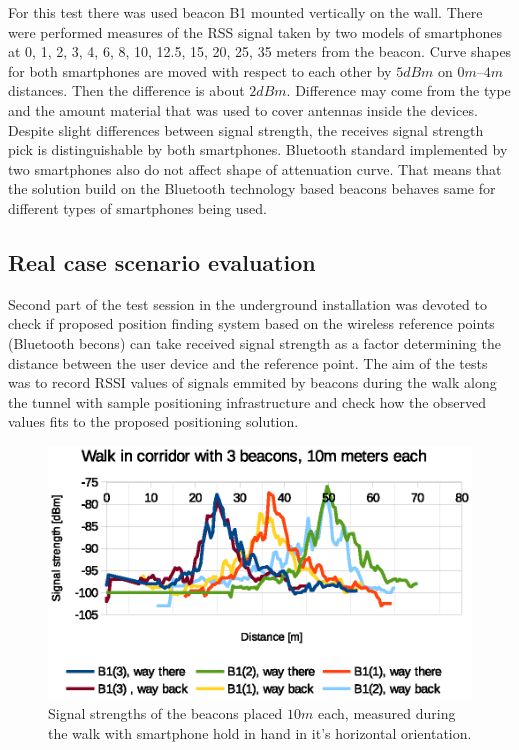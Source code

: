 \documentclass[../main.tex]{subfiles}
\begin{document}
For this test there was used beacon B1 mounted vertically on the wall. There were performed measures of the RSS signal taken by two models of smartphones at 0, 1, 2, 3, 4, 6, 8, 10, 12.5, 15, 20, 25, 35 meters from the beacon. Curve shapes for both smartphones are moved with respect to each other by $5dBm$ on $0m$--$4m$ distances. Then the difference is about $2dBm$. Difference may come from the type and the amount material that was used to cover antennas inside the devices. Despite slight differences between signal strength, the receives signal strength pick is distinguishable by both smartphones. Bluetooth standard implemented by two smartphones also do not affect shape of attenuation curve. That means that the solution build on the Bluetooth technology based beacons behaves same for different types of smartphones being used.

\FloatBarrier
\subsection{Real case scenario evaluation} %
\label{sub:real_case_scenario_evaluation}

Second part of the test session in the underground installation was devoted to check if proposed position finding system based on the wireless reference points (Bluetooth becons) can take received signal strength as a factor determining the distance between the user device and the reference point. The aim of the tests was to record RSSI values of signals emmited by beacons during the walk along the tunnel with sample positioning infrastructure and check how the observed values fits to the proposed positioning solution.

\begin{figure}[!htbp]
\includegraphics[width=\textwidth, keepaspectratio]{pictures/tests_case10_walk_10m_raw}
\centering
\caption{Signal strengths of the beacons placed $10m$ each, measured during the walk with smartphone hold in hand in it's horizontal orientation.}
\label{fig:tests_case10_walk_10m_raw}
\end{figure}
\end{document}
